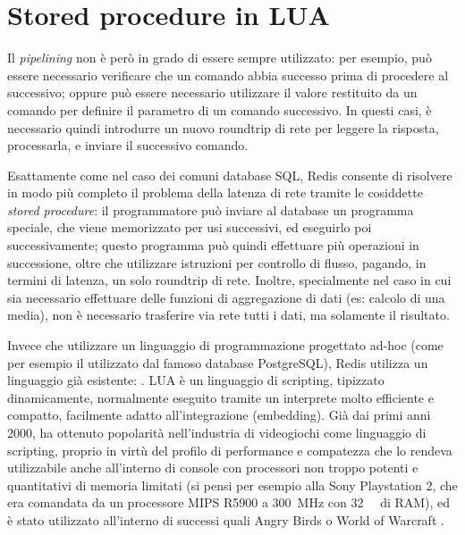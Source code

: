 \section{Stored procedure in LUA}
\label{sec:redis:lua}

Il \emph{pipelining} non è però in grado di essere sempre utilizzato: per esempio, può essere
necessario verificare che un comando abbia successo prima di procedere al successivo; oppure
può essere necessario utilizzare il valore restituito da un comando per definire il parametro 
di un comando successivo. In questi casi, è necessario quindi introdurre un nuovo roundtrip di
rete per leggere la risposta, processarla, e inviare il successivo comando.

Esattamente come nel caso dei comuni database SQL, Redis consente di risolvere in modo più completo
il problema della latenza di rete tramite le cosiddette \emph{stored procedure}: il programmatore
può inviare al database un programma speciale, che viene memorizzato per usi successivi, ed
eseguirlo poi successivamente; questo programma può quindi effettuare più operazioni in successione,
oltre che utilizzare istruzioni per controllo di flusso, pagando, in termini di latenza, un solo
roundtrip di rete. Inoltre, specialmente nel caso in cui sia necessario effettuare delle funzioni di
aggregazione di dati (es: calcolo di una media), non è necessario trasferire via rete tutti i dati,
ma solamente il risultato.

Invece che utilizzare un linguaggio di programmazione progettato ad-hoc (come per esempio il
 utilizzato dal
famoso database PostgreSQL), Redis utilizza un linguaggio già esistente:
. LUA è un linguaggio di scripting, tipizzato dinamicamente,
normalmente eseguito tramite un interprete molto efficiente e compatto, facilmente adatto
all'integrazione (embedding). Già dai primi anni 2000, ha ottenuto popolarità nell'industria
di videogiochi come linguaggio di scripting, proprio in virtù del profilo di performance e
compatezza che lo rendeva utilizzabile anche all'interno di console con processori non troppo
potenti e quantitativi di memoria limitati (si pensi per esempio alla Sony Playstation 2, che era
comandata da un processore MIPS R5900 a \SI{300}{\mega\hertz} con \SI{32}{\mebi\byte} di RAM), ed è
stato utilizzato all'interno di successi quali Angry Birds \cite{lua-angry} o World of Warcraft
\cite{lua-wow}.

